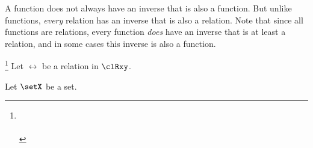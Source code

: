 

A {function} does not always have an inverse that is also a function.
But unlike functions, \emph{every} relation has an inverse that is also a relation.
Note that since all functions are relations,
every function \emph{does} have an inverse that is at least a relation,
and in some cases this inverse is also a function.
\begin{definition}
\footnote{
  \\
  \\
  }
\label{def:rel_inverse}
\label{def:inverse}
Let $\rel$ be a relation in $\clRxy$.
\end{definition}


\begin{definition}
\label{def:pset}
Let $\setX$ be a set.
\end{definition}


